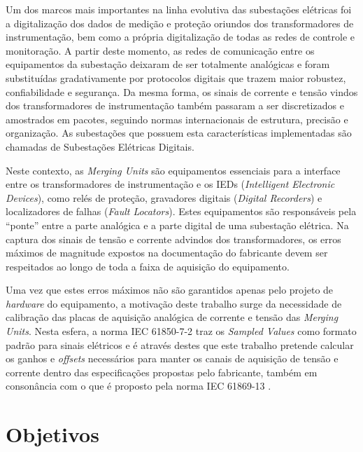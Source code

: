 Um dos marcos mais importantes na linha evolutiva das subestações elétricas foi a digitalização dos dados de medição e proteção oriundos dos transformadores de instrumentação, bem como a própria digitalização de todas as redes de controle e monitoração. A partir deste momento, as redes de comunicação entre os equipamentos da subestação deixaram de ser totalmente analógicas e foram substituídas gradativamente por protocolos digitais que trazem maior robustez, confiabilidade e segurança. Da mesma forma, os sinais de corrente e tensão vindos dos transformadores de instrumentação também passaram a ser discretizados e amostrados em pacotes, seguindo normas internacionais de estrutura, precisão e organização. As subestações que possuem esta características implementadas são chamadas de Subestações Elétricas Digitais.

Neste contexto, as \textit{Merging Units} são equipamentos essenciais para a interface entre os transformadores de instrumentação e os IEDs (\textit{Intelligent Electronic Devices}), como relés de proteção, gravadores digitais (\textit{Digital Recorders}) e localizadores de falhas (\textit{Fault Locators}). Estes equipamentos são responsáveis pela ``ponte'' entre a parte analógica e a parte digital de uma subestação elétrica. Na captura dos sinais de tensão e corrente advindos dos transformadores, os erros máximos de magnitude expostos na documentação do fabricante devem ser respeitados ao longo de toda a faixa de aquisição do equipamento.


Uma vez que estes erros máximos não são garantidos apenas pelo projeto de \textit{hardware} do equipamento, a motivação deste trabalho surge da necessidade de calibração das placas de aquisição analógica de corrente e tensão das \textit{Merging Units}. Nesta esfera, a norma IEC 61850-7-2 \cite{IEC61850_7-2} traz os \textit{Sampled Values} como formato padrão para sinais elétricos e é através destes que este trabalho pretende calcular os ganhos e \textit{offsets} necessários para manter os canais de aquisição de tensão e corrente dentro das especificações propostas pelo fabricante, também em consonância com o que é proposto pela norma IEC 61869-13 \cite{IEC61869-13}. 

\section{Objetivos}


